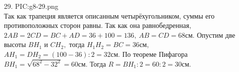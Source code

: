 29. {{PIC:g8-29.png}}\\
Так как трапеция является описанным четырёхугольником, суммы его противоположных сторон равны. Так как она равнобедренная, $2AB=2CD=BC+AD=36+100=136,\ AB=CD=68$см. Опустим две высоты $BH_1$ и $CH_2,$ тогда $H_1H_2=BC=36$см, $AH_1=DH_2=(100-36):2=32$см. По теореме Пифагора $BH_1=\sqrt{68^2-32^2}=60$см. Тогда $R=BH_1:2=60:2=30$см.\\
